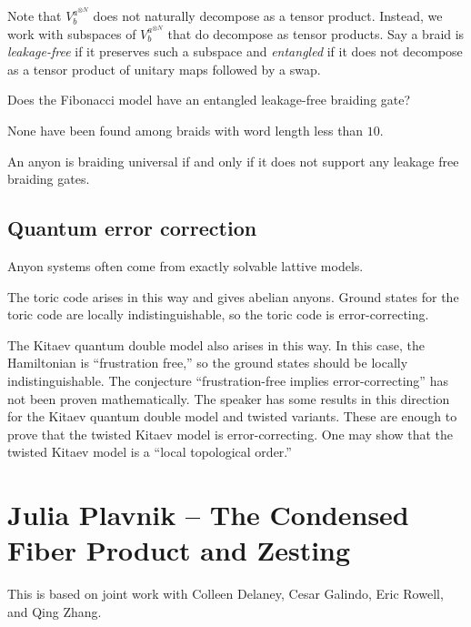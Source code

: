 \documentclass{amsart}
\begin{document}
Note that $V_b^{a^{\otimes N}}$ does not naturally decompose as a tensor product.
Instead, we work with subspaces of $V_b^{a^{\otimes N}}$ that do decompose as tensor products.
Say a braid is \emph{leakage-free} if it preserves such a subspace and \emph{entangled} if it does not decompose as a tensor product of unitary maps followed by a swap.

\begin{qn}
  Does the Fibonacci model have an entangled leakage-free braiding gate?
\end{qn}

None have been found among braids with word length less than $10$.

\begin{conj}
  An anyon is braiding universal if and only if it does not support any leakage free braiding gates.
\end{conj}

\subsection{Quantum error correction}

Anyon systems often come from exactly solvable lattive models.

\begin{ex}
  The toric code arises in this way and gives abelian anyons.
  Ground states for the toric code are locally indistinguishable, so the toric code is error-correcting.
\end{ex}

\begin{ex}
  The Kitaev quantum double model also arises in this way.
  In this case, the Hamiltonian is ``frustration free,'' so the ground states should be locally indistinguishable.
  The conjecture ``frustration-free implies error-correcting'' has not been proven mathematically.
  The speaker has some results in this direction for the Kitaev quantum double model and twisted variants.
  These are enough to prove that the twisted Kitaev model is error-correcting.
  One may show that the twisted Kitaev model is a ``local topological order.''
\end{ex}

\section{Julia Plavnik -- The Condensed Fiber Product and Zesting}

This is based on joint work with Colleen Delaney, Cesar Galindo, Eric Rowell, and Qing Zhang.
\end{document}
